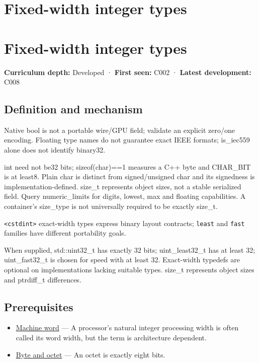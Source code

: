 \hypertarget{appendix-cc04044b5782}{}
\section*{Fixed-width integer types}
\section{Fixed-width integer types}\label{appendix-cc04044b5782-fixed-width-integer-types}

\textbf{Curriculum depth:} Developed · \textbf{First seen:} C002 · \textbf{Latest development:} C008

\subsection{Definition and mechanism}\label{appendix-cc04044b5782-definition-and-mechanism}

Native bool is not a portable wire/GPU field; validate an explicit zero/one encoding. Floating type names do not guarantee exact IEEE formats; is\_iec559 alone does not identify binary32.

int need not be32 bits; sizeof(char)==1 measures a C++ byte and CHAR\_BIT is at least8. Plain char is distinct from signed/unsigned char and its signedness is implementation-defined. size\_t represents object sizes, not a stable serialized field. Query numeric\_limits for digits, lowest, max and floating capabilities. A container's size\_type is not universally required to be exactly size\_t.

\texttt{\textless{}cstdint\textgreater{}} exact-width types express binary layout contracts; \texttt{least} and \texttt{fast} families have different portability goals.

When supplied, std::uint32\_t has exactly 32 bits; uint\_least32\_t has at least 32; uint\_fast32\_t is chosen for speed with at least 32. Exact-width typedefs are optional on implementations lacking suitable types. size\_t represents object sizes and ptrdiff\_t differences.

\subsection{Prerequisites}\label{appendix-cc04044b5782-prerequisites}

\begin{itemize}
\tightlist
\item
  \hyperref[appendix-d67a19507dc5]{Machine word} --- A processor's natural integer processing width is often called its word width, but the term is architecture dependent.
\item
  \hyperref[appendix-5bee2df85484]{Byte and octet} --- An octet is exactly eight bits.
\end{itemize}


